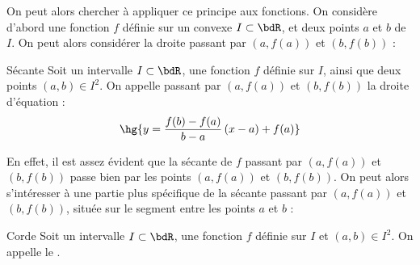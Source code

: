 \documentclass[a4paper,french,bookmarks]{article}
\begin{document}
On peut alors chercher à appliquer ce principe aux fonctions. On considère d'abord une fonction $f$ définie sur un convexe $I \subset \bdR$, et deux points $a$ et $b$ de $I$. On peut alors considérer la droite passant par $\left(a, f(a)\right)$ et $\left(b, f(b)\right)$ :

\begin{definition}{Sécante}{}
    Soit un intervalle $I \subset \bdR$, une fonction $f$ définie sur $I$, ainsi que deux points $(a, b) \in I^2$. On appelle  passant par $\left(a, f(a)\right)$ et $\left(b, f(b)\right)$ la droite d'équation :
    \[ \hg{y = \dfrac{f(b)-f(a)}{b-a}\left(x - a\right) + f(a)}\]
\end{definition}

En effet, il est assez évident que la sécante de $f$ passant par $\left(a, f(a)\right)$ et $\left(b, f(b)\right)$ passe bien par les points $\left(a, f(a)\right)$ et $\left(b, f(b)\right)$. On peut alors s'intéresser à une partie plus spécifique de la sécante passant par $\left(a, f(a)\right)$ et $\left(b, f(b)\right)$, située sur le segment entre les points $a$ et $b$ :
    
\begin{definition}{Corde}{}
    Soit un intervalle $I \subset \bdR$, une fonction $f$ définie sur $I$ et $(a, b) \in I^2$. On appelle  le .
\end{definition}
\end{document}
